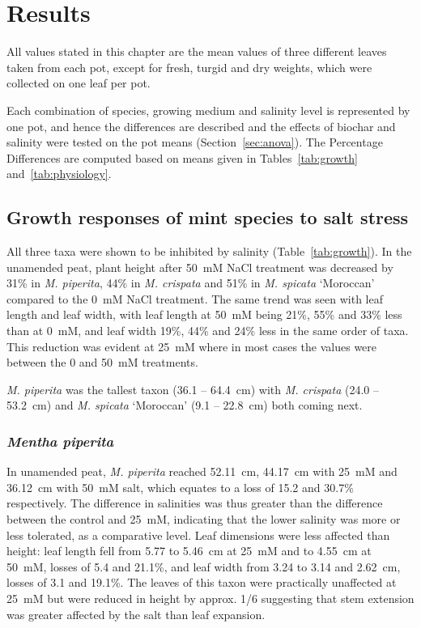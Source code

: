 \chapter{Results}

All values stated in this chapter are the mean values of three different leaves taken from each pot, except for fresh, turgid and dry weights, which were collected on one leaf per pot.

Each combination of species, growing medium and salinity level is represented by one pot, and hence the differences are described and the effects of biochar and salinity were tested on the pot means (Section~\ref{sec:anova}). The Percentage Differences are computed based on means given in Tables~\ref{tab:growth} and~\ref{tab:physiology}.

\section{Growth responses of mint species to salt stress}

All three taxa were shown to be inhibited by salinity (Table~\ref{tab:growth}). In the unamended peat, plant height after 50~mM NaCl treatment was decreased by 31\% in \textit{M. piperita}, 44\% in \textit{M. crispata} and 51\% in \textit{M. spicata} `Moroccan' compared to the 0~mM NaCl treatment. The same trend was seen with leaf length and leaf width, with leaf length at 50~mM being 21\%, 55\% and 33\% less than at 0~mM, and leaf width 19\%, 44\% and 24\% less in the same order of taxa. This reduction was evident at 25~mM where in most cases the values were between the 0 and 50~mM treatments.

\textit{M. piperita} was the tallest taxon (36.1 – 64.4~cm) with \textit{M. crispata} (24.0 – 53.2~cm) and \textit{M. spicata} `Moroccan' (9.1 – 22.8~cm) both coming next.

\subsection{\textit{Mentha piperita}}

In unamended peat, \textit{M. piperita} reached 52.11~cm, 44.17~cm with 25~mM and 36.12~cm with 50~mM salt, which equates to a loss of 15.2 and 30.7\% respectively. The difference in salinities was thus greater than the difference between the control and 25~mM, indicating that the lower salinity was more or less tolerated, as a comparative level. Leaf dimensions were less affected than height: leaf length fell from 5.77 to 5.46~cm at 25~mM and to 4.55~cm at 50~mM, losses of 5.4 and 21.1\%, and leaf width from 3.24 to 3.14 and 2.62~cm, losses of 3.1 and 19.1\%. The leaves of this taxon were practically unaffected at 25~mM but were reduced in height by approx. 1/6 suggesting that stem extension was greater affected by the salt than leaf expansion.

